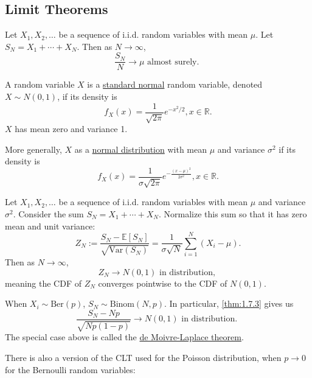 \subsection{Limit Theorems}

\begin{theorem}
\label{thm:1.7.1}
Let $X_1, X_2, \dots$ be a sequence of i.i.d. random variables with mean $\mu$. Let $S_N = X_1 + \cdots 
+ X_N$. Then as $N \to \infty$, 
\[ \frac{S_N}{N} \to \mu \text{ almost surely. } \]
\end{theorem}

\begin{definition}[]
\label{def:1.7.2}
A random variable $X$ is a \underline{standard normal} random variable, denoted $X \sim N(0, 1)$, if 
its density is 
\[ f_X(x) = \frac{1}{\sqrt{2 \pi}}e^{-x^2 / 2}, x \in \mathbb{R}. \]
$X$ has mean zero and variance 1.

More generally, $X$ as a \underline{normal distribution} with mean $\mu$ and variance $\sigma^2$ if 
its density is 
\[ f_X(x) = \frac{1}{\sigma \sqrt{2 \pi}} e^{-\frac{(x - \mu)^2}{2 \sigma^2}}, x \in \mathbb{R}. \]
\end{definition}

\begin{theorem}
\label{thm:1.7.3}
Let $X_1, X_2, \dots$ be a sequence of i.i.d. random variables with mean $\mu$ and variance $\sigma^2$. 
Consider the sum $S_N = X_1 + \cdots + X_N$. Normalize this sum so that it has zero mean and unit variance: 
\[ Z_N := \frac{S_N - \mathbb{E}[S_N]}{\sqrt{\mathrm{Var}(S_N)}} = 
\frac{1}{\sigma \sqrt{N}} \sum_{i = 1}^{N} (X_i - \mu). \]
Then as $N \to \infty$, 
\[ Z_N \to N(0, 1) \text{ in distribution, } \]
meaning the CDF of $Z_N$ converges pointwise to the CDF of $N(0, 1)$. 
\end{theorem}

\begin{example}
\label{ex:1.7.4}
When $X_i \sim \text{Ber}(p)$, $S_N \sim \text{Binom}(N, p)$. In particular, \cref{thm:1.7.3} gives us
\[ \frac{S_N - Np}{\sqrt{Np(1 - p)}} \to N(0, 1) \text{ in distribution. } \]
The special case above is called the \underline{de Moivre-Laplace theorem}.
\end{example}

There is also a version of the CLT used for the Poisson distribution, when $p \to 0$ for the Bernoulli 
random variables: 

